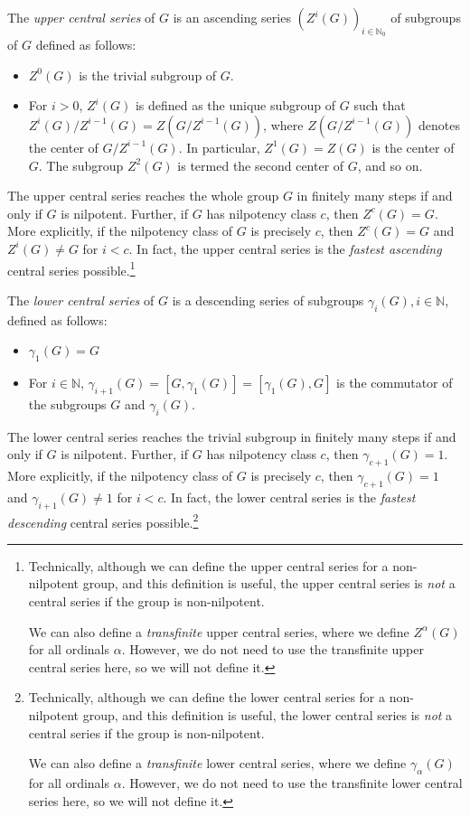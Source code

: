 The {\em upper central series} of $G$ is an ascending series
$(Z^i(G))_{i \in \mathbb{N}_0}$ of subgroups of $G$ defined as
follows:

\begin{itemize}
\item $Z^0(G)$ is the trivial subgroup of $G$.
\item For $i > 0$, $Z^i(G)$ is defined as the unique subgroup of $G$
  such that $Z^i(G)/Z^{i-1}(G) = Z(G/Z^{i-1}(G))$, where
  $Z(G/Z^{i-1}(G))$ denotes the center of $G/Z^{i-1}(G)$. In
  particular, $Z^1(G) = Z(G)$ is the center of $G$. The subgroup
  $Z^2(G)$ is termed the second center of $G$, and so on.
\end{itemize}

The upper central series reaches the whole group $G$ in finitely many
steps if and only if $G$ is nilpotent. Further, if $G$ has nilpotency
class $c$, then $Z^c(G) = G$. More explicitly, if the nilpotency class
of $G$ is precisely $c$, then $Z^c(G) = G$ and $Z^i(G) \ne G$ for $i <
c$. In fact, the upper central series is the {\em fastest ascending}
central series possible.\footnote{Technically, although we can define
  the upper central series for a non-nilpotent group, and this
  definition is useful, the upper central series is {\em not} a
  central series if the group is non-nilpotent.

We can also define a {\em transfinite} upper central series, where we
define $Z^\alpha(G)$ for all ordinals $\alpha$. However, we do not
need to use the transfinite upper central series here, so we will not
define it.}

The {\em lower central series} of $G$ is a descending series of
subgroups $\gamma_i(G), i \in \mathbb{N}$, defined as follows:

\begin{itemize}
\item $\gamma_1(G) = G$
\item For $i \in \mathbb{N}$, $\gamma_{i+1}(G) = [G,\gamma_1(G)] =
  [\gamma_1(G),G]$ is the commutator of the subgroups $G$ and
  $\gamma_i(G)$.
\end{itemize}

The lower central series reaches the trivial subgroup in finitely many
steps if and only if $G$ is nilpotent. Further, if $G$ has nilpotency
class $c$, then $\gamma_{c+1}(G) = 1$. More explicitly, if the
nilpotency class of $G$ is precisely $c$, then $\gamma_{c+1}(G) = 1$
and $\gamma_{i+1}(G) \ne 1$ for $i < c$. In fact, the lower central
series is the {\em fastest descending} central series
possible.\footnote{Technically, although we can define the lower
  central series for a non-nilpotent group, and this definition is
  useful, the lower central series is {\em not} a central series if
  the group is non-nilpotent.

We can also define a {\em transfinite} lower central series, where we
define $\gamma_\alpha(G)$ for all ordinals $\alpha$. However, we do
not need to use the transfinite lower central series here, so we will
not define it.}

